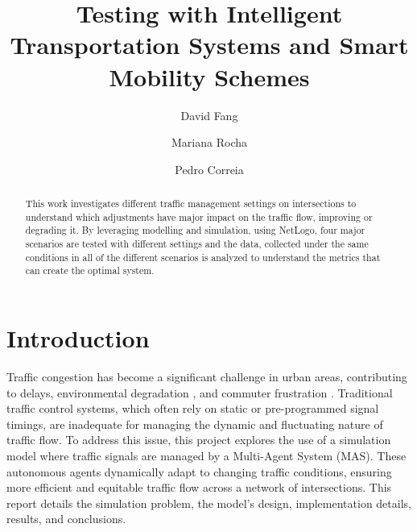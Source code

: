 \documentclass[sigconf]{acmart}
\begin{document}
\title{Testing with Intelligent Transportation Systems and Smart Mobility Schemes\\}

\author{David Fang}

\author{Mariana Rocha}


\author{Pedro Correia}

\begin{abstract}
This work investigates different traffic management settings on intersections to understand which adjustments have major impact on the traffic flow, improving or degrading it.  By leveraging modelling and simulation, using NetLogo, four major scenarios are tested with different settings and the data, collected under the same conditions in all of the different scenarios is analyzed to understand the metrics that can create the optimal system.
\end{abstract}



\maketitle



\section{Introduction}
Traffic congestion has become a significant challenge in urban areas, contributing to delays, environmental degradation \cite{zhangAirPollutionHealth2013}, and commuter frustration 
\cite{liInfluenceTrafficCongestion2020}. Traditional traffic control systems, which often rely on static or pre-programmed signal timings, are inadequate for managing the dynamic and fluctuating nature of traffic flow. To address this issue, this project explores the use of a simulation model where traffic signals are managed by a Multi-Agent System (MAS). These autonomous agents dynamically adapt to changing traffic conditions, ensuring more efficient and equitable traffic flow across a network of intersections. 
This report details the simulation problem, the model’s design, implementation details, results, and conclusions.
\end{document}
